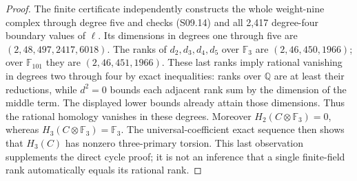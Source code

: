 \begin{proof}
The finite certificate independently constructs the whole
weight-nine complex through degree five and checks (S09.14)
and all 2,417 degree-four boundary values of $\ell$.  Its
dimensions in degrees one through five are
$(2,48,497,2417,6018)$.  The ranks of $d_2,d_3,d_4,d_5$
over $\mathbb F_3$ are $(2,46,450,1966)$; over
$\mathbb F_{101}$ they are $(2,46,451,1966)$.
These last ranks imply rational vanishing in degrees two
through four by exact inequalities: ranks over $\mathbb Q$
are at least their reductions, while $d^2=0$ bounds each
adjacent rank sum by the dimension of the middle term.
The displayed lower bounds already attain those dimensions.
Thus the rational homology vanishes in these degrees.
Moreover $H_2(C\otimes\mathbb F_3)=0$, whereas
$H_3(C\otimes\mathbb F_3)=\mathbb F_3$.
The universal-coefficient exact sequence then shows that
$H_3(C)$ has nonzero three-primary torsion.  This last
observation supplements the direct cycle proof; it is not
an inference that a single finite-field rank automatically
equals its rational rank.
\end{proof}
